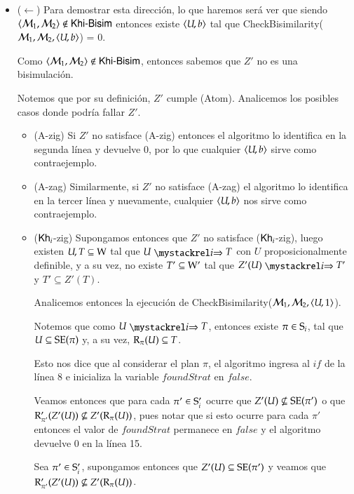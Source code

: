 \begin{demostracion}
\begin{itemize}
        \item ($\leftarrow$) Para demostrar esta dirección, lo que haremos será ver que siendo 
        $\tup{\modults_1,\modults_2} \not \in \KHiBisim$ entonces
        existe $\tup{U,b}$ tal que CheckBisimilarity($\modults_1,\modults_2,\tup{U,b}$) = 0.  
        
        Como $\tup{\modults_1,\modults_2} \not \in \KHiBisim$, entonces sabemos que $Z'$ no es una bisimulación.

        Notemos que por su definición, $Z'$ cumple (Atom). Analicemos los posibles casos donde podría fallar $Z'$.

        \begin{itemize}
            \item (A-zig) Si $Z'$ no satisface (A-zig) entonces el algoritmo lo identifica en la segunda línea y devuelve 0, 
            por lo que cualquier $\tup{U,b}$ sirve como contraejemplo.
            \item (A-zag) Similarmente, si $Z'$ no satisface (A-zag) el algoritmo lo identifica en la tercer línea y 
            nuevamente, cualquier $\tup{U,b}$ nos sirve como contraejemplo.
            \item ($\khi$-zig) Supongamos entonces que $Z'$ no satisface ($\khi$-zig), luego existen $U, T \subseteq \W$ tal que
            $U \ultsExecAgi T$ con $U$ proposicionalmente definible, y a su vez, no existe $T' \subseteq \W'$ tal que $Z'(U) \ultsExecAgi T'$ y 
            $T' \subseteq Z'(T)$.

            Analicemos entonces la ejecución de CheckBisimilarity($\modults_1,\modults_2,\tup{U,1}$).

            Notemos que como $U \ultsExecAgi T$, entonces existe $\pi \in \S_i$, tal que $U \subseteq \sexec(\pi)$ y, 
            a su vez, $\R_\pi(U) \subseteq T$. 

            Esto nos dice que al considerar el plan $\pi$, el algoritmo ingresa al $if$ de la línea 8 e inicializa 
            la variable $foundStrat$ en $false$.

            Veamos entonces que para cada $\pi' \in \S_i'$ ocurre que $Z'(U) \not \subseteq \sexec(\pi')$ o que 
            $\R'_{\pi'}(Z'(U)) \not \subseteq Z'(\R_\pi(U))$, pues notar que si esto ocurre para cada $\pi'$ entonces 
            el valor de $foundStrat$ permanece en $false$ y el algoritmo devuelve 0 en la línea 15.

            Sea $\pi' \in \S_i'$, supongamos entonces que $Z'(U) \subseteq \sexec(\pi')$ y veamos que 
            $\R'_{\pi'}(Z'(U)) \not \subseteq Z'(\R_\pi(U))$.


\end{itemize}
\end{itemize}
\end{demostracion}
